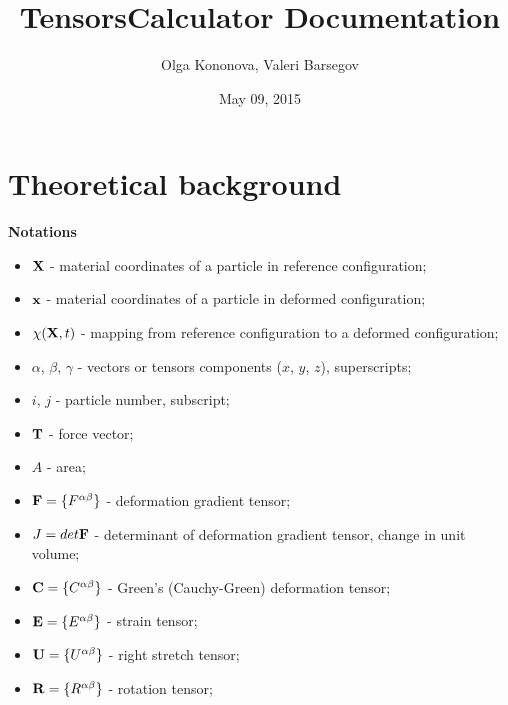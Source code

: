 \documentclass[letterpaper,10pt,english]{sphinxmanual}
\title{TensorsCalculator Documentation}
\date{May 09, 2015}
\author{Olga Kononova, Valeri Barsegov}
\begin{document}
\maketitle
\tableofcontents
{}\label{index::doc}



\chapter{Theoretical background}
\label{general::doc}\label{general:tensorscalculator-package}\label{general:theoretical-background}
\textbf{Notations}
\begin{itemize}
\item {} 
${\bf X}$ - material coordinates of a particle in reference configuration;

\item {} 
${\bf x}$ - material coordinates of a particle in deformed configuration;

\item {} 
$\chi({\bf X}, t)$ - mapping from reference configuration to a deformed configuration;

\item {} 
$\alpha$, $\beta$, $\gamma$ - vectors or tensors components ($x$, $y$, $z$), superscripts;

\item {} 
$i$, $j$ - particle number, subscript;

\item {} 
${\bf T}$ - force vector;

\item {} 
$A$ - area;

\item {} 
${\bf F}=\{F^{\alpha\beta}\}$ - deformation gradient tensor;

\item {} 
$J=det{\bf F}$ - determinant of deformation gradient tensor, change in unit volume;

\item {} 
${\bf C}=\{C^{\alpha\beta}\}$ - Green's (Cauchy-Green) deformation tensor;

\item {} 
${\bf E}=\{E^{\alpha\beta}\}$ - strain tensor;

\item {} 
${\bf U}=\{U^{\alpha\beta}\}$ - right stretch tensor;

\item {} 
${\bf R}=\{R^{\alpha\beta}\}$ - rotation tensor;


\end{itemize}
\end{document}
